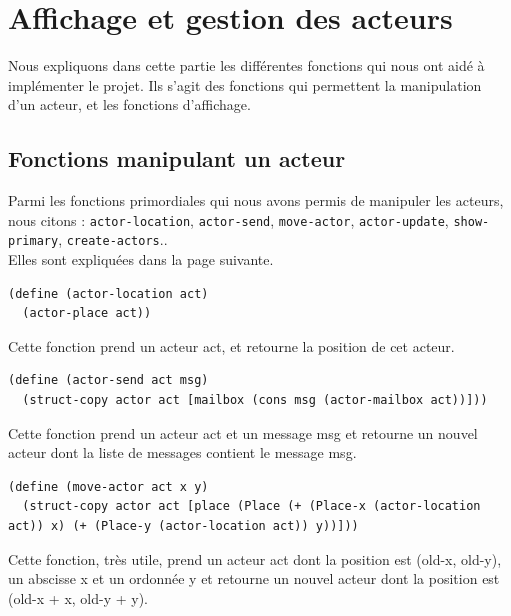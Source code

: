 \documentclass[a4paper]{article}
\begin{document}
\section{Affichage et gestion des acteurs}
Nous expliquons dans cette partie les différentes fonctions qui nous ont aidé à implémenter le projet. Ils s'agit des fonctions qui permettent la manipulation d'un acteur, et les fonctions d'affichage.
\subsection{Fonctions manipulant un acteur}
Parmi les fonctions primordiales qui nous avons permis de manipuler les acteurs, nous citons : \verb!actor-location!, \verb!actor-send!, \verb!move-actor!, \verb!actor-update!, \verb!show-primary!, \verb!create-actors!..\\ Elles sont expliquées dans la page suivante.

\begin{lstlisting}
(define (actor-location act)
  (actor-place act))
\end{lstlisting}
Cette fonction prend un acteur act, et retourne la position de cet acteur.

\begin{lstlisting}
(define (actor-send act msg)
  (struct-copy actor act [mailbox (cons msg (actor-mailbox act))]))
\end{lstlisting}
Cette fonction prend un acteur act et un message msg et retourne un nouvel acteur dont la liste de messages contient le message msg.

\begin{lstlisting}
(define (move-actor act x y)
  (struct-copy actor act [place (Place (+ (Place-x (actor-location act)) x) (+ (Place-y (actor-location act)) y))]))
\end{lstlisting}
Cette fonction, très utile, prend un acteur act dont la position est (old-x, old-y), un abscisse x et un ordonnée y et retourne un nouvel acteur dont la position est (old-x + x, old-y + y).
\end{document}
